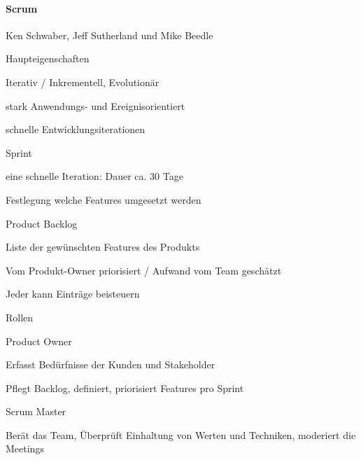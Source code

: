 \documentclass[a4paper]{article}
\begin{document}
\begin{multicols}{3}
  \paragraph{Scrum}
  \begin{itemize*}
    \item [Ken Schwaber, Jeff Sutherland und Mike Beedle]
    \item Haupteigenschaften
          \begin{itemize*}
            \item Iterativ / Inkrementell, Evolutionär
            \item stark Anwendungs- und Ereignisorientiert
            \item schnelle Entwicklungsiterationen
          \end{itemize*}
    \item Sprint
          \begin{itemize*}
            \item eine schnelle Iteration: Dauer ca. 30 Tage
            \item Festlegung welche Features umgesetzt werden
          \end{itemize*}
    \item Product Backlog
          \begin{itemize*}
            \item Liste der gewünschten Features des Produkts
            \item Vom Produkt-Owner priorisiert / Aufwand vom Team geschätzt
            \item Jeder kann Einträge beisteuern
          \end{itemize*}
    \item Rollen
          \begin{itemize*}
            \item Product Owner
                  \begin{itemize*}
                    \item Erfasst Bedürfnisse der Kunden und Stakeholder
                    \item Pflegt Backlog, definiert, priorisiert Features pro Sprint
                  \end{itemize*}
            \item Scrum Master
                  \begin{itemize*}
                    \item Berät das Team, Überprüft Einhaltung von Werten und Techniken, moderiert die Meetings

\end{itemize*}
\end{itemize*}
\end{itemize*}
\end{multicols}
\end{document}
